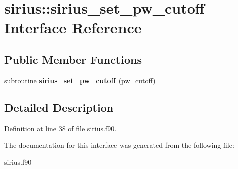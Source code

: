\hypertarget{interfacesirius_1_1sirius__set__pw__cutoff}{}\section{sirius\+:\+:sirius\+\_\+set\+\_\+pw\+\_\+cutoff Interface Reference}
\label{interfacesirius_1_1sirius__set__pw__cutoff}
\subsection*{Public Member Functions}
\begin{DoxyCompactItemize}
\item 
\hypertarget{interfacesirius_1_1sirius__set__pw__cutoff_abe8bbc2441d2a8b9ae148c62b895df9e}{}subroutine {\bfseries sirius\+\_\+set\+\_\+pw\+\_\+cutoff} (pw\+\_\+cutoff)\label{interfacesirius_1_1sirius__set__pw__cutoff_abe8bbc2441d2a8b9ae148c62b895df9e}

\end{DoxyCompactItemize}


\subsection{Detailed Description}


Definition at line 38 of file sirius.\+f90.



The documentation for this interface was generated from the following file\+:\begin{DoxyCompactItemize}
\item 
sirius.\+f90\end{DoxyCompactItemize}
